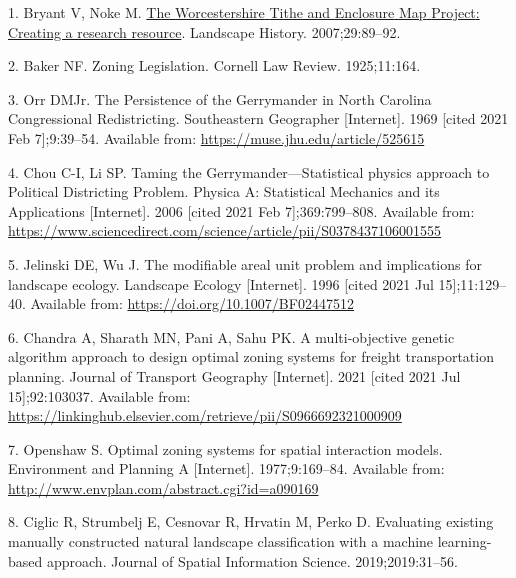 \documentclass{josis}
\newlength{\cslhangindent}
\newenvironment{CSLReferences}[2] %
 {%
  \setlength{\parindent}{0pt}
  \ifodd #1 \everypar{\setlength{\hangindent}{\cslhangindent}}\ignorespaces\fi
  \ifnum #2 > 0
  \setlength{\parskip}{#2\baselineskip}
  \fi
 }%
 {}
\begin{document}
\hypertarget{refs}{}
\begin{CSLReferences}{0}{0}
\leavevmode{}%
1. Bryant V, Noke M. \href{https://doi.org/gkb5qs}{The {Worcestershire} {Tithe} and {Enclosure} {Map} {Project}: Creating a research resource}. Landscape History. 2007;29:89--92.

\leavevmode{}%
2. Baker NF. Zoning {Legislation}. Cornell Law Review. 1925;11:164.

\leavevmode{}%
3. Orr DMJr. The {Persistence} of the {Gerrymander} in {North} {Carolina} {Congressional} {Redistricting}. Southeastern Geographer {[}Internet{]}. 1969 {[}cited 2021 Feb 7{]};9:39--54. Available from: \url{https://muse.jhu.edu/article/525615}

\leavevmode{}%
4. Chou C-I, Li SP. Taming the {Gerrymander}---{Statistical} physics approach to {Political} {Districting} {Problem}. Physica A: Statistical Mechanics and its Applications {[}Internet{]}. 2006 {[}cited 2021 Feb 7{]};369:799--808. Available from: \url{https://www.sciencedirect.com/science/article/pii/S0378437106001555}

\leavevmode{}%
5. Jelinski DE, Wu J. The modifiable areal unit problem and implications for landscape ecology. Landscape Ecology {[}Internet{]}. 1996 {[}cited 2021 Jul 15{]};11:129--40. Available from: \url{https://doi.org/10.1007/BF02447512}

\leavevmode{}%
6. Chandra A, Sharath MN, Pani A, Sahu PK. A multi-objective genetic algorithm approach to design optimal zoning systems for freight transportation planning. Journal of Transport Geography {[}Internet{]}. 2021 {[}cited 2021 Jul 15{]};92:103037. Available from: \url{https://linkinghub.elsevier.com/retrieve/pii/S0966692321000909}

\leavevmode{}%
7. Openshaw S. Optimal zoning systems for spatial interaction models. Environment and Planning A {[}Internet{]}. 1977;9:169--84. Available from: \url{http://www.envplan.com/abstract.cgi?id=a090169}

\leavevmode{}%
8. Ciglic R, Strumbelj E, Cesnovar R, Hrvatin M, Perko D. Evaluating existing manually constructed natural landscape classification with a machine learning-based approach. Journal of Spatial Information Science. 2019;2019:31--56.


\end{CSLReferences}
\end{document}
